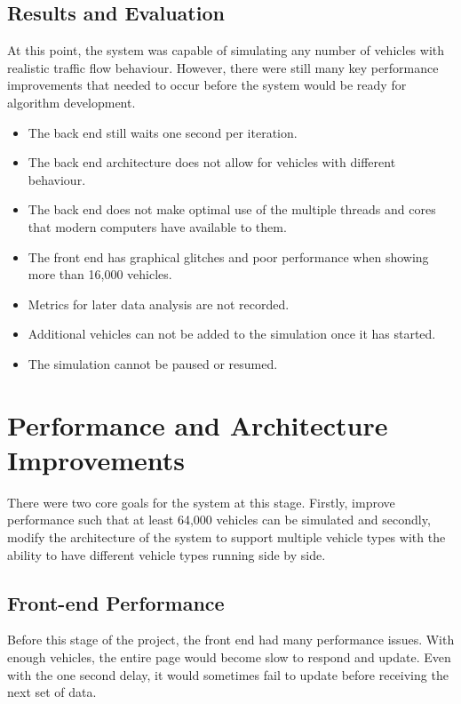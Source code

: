 \documentclass[ %
                    author={Alexander Hill},
                supervisor={Dr. Benjamin Sach},
                    degree={MEng},
                     title={MARMOSET},
                  subtitle={Multi-Agent Route Management using Online Simulation for Efficient Transportation},
                      type={research},
                      year={2016} ]{dissertation}
\begin{document}
\subsection{Results and Evaluation}

At this point, the system was capable of simulating any number of vehicles with
realistic traffic flow behaviour. However, there were still many key performance
improvements that needed to occur before the system would be ready for
algorithm development.

\begin{itemize}
    \item The back end still waits one second per iteration.
    \item The back end architecture does not allow for vehicles with different
        behaviour.
    \item The back end does not make optimal use of the multiple threads and
        cores that modern computers have available to them.
    \item The front end has graphical glitches and poor performance when
        showing more than 16,000 vehicles.
    \item Metrics for later data analysis are not recorded.
    \item Additional vehicles can not be added to the simulation once it has
        started.
    \item The simulation cannot be paused or resumed.
\end{itemize}

\section{Performance and Architecture Improvements}

There were two core goals for the system at this stage. Firstly, improve
performance such that at least 64,000 vehicles can be simulated and secondly,
modify the architecture of the system to support multiple vehicle types with the
ability to have different vehicle types running side by side.

\subsection{Front-end Performance}

Before this stage of the project, the front end had many performance issues.
With enough vehicles, the entire page would become slow to respond and update.
Even with the one second delay, it would sometimes fail to update before
receiving the next set of data.
\end{document}
